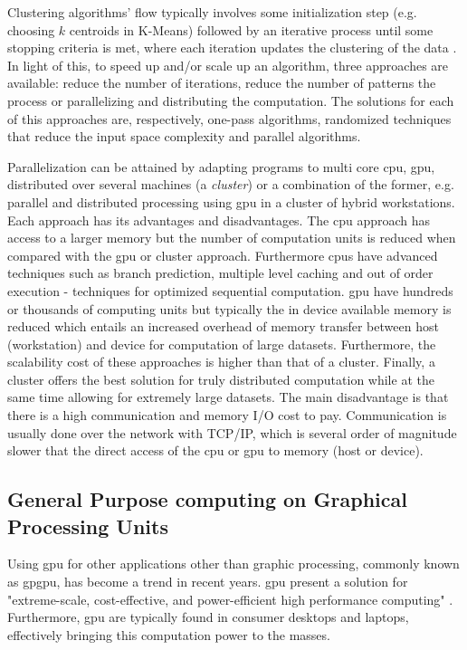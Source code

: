 Clustering algorithms' flow typically involves some initialization step (e.g. choosing $k$ centroids in K-Means) followed by an iterative process until some stopping criteria is met, where each iteration updates the clustering of the data \cite{Aggarwal2014}. In light of this, to speed up and/or scale up an algorithm, three approaches are available: reduce the number of iterations, reduce the number of patterns the process or parallelizing and distributing the computation. The solutions for each of this approaches are, respectively, one-pass algorithms, randomized techniques that reduce the input space complexity and parallel algorithms.

Parallelization can be attained by adapting programs to multi core \gls{cpu}, \gls{gpu}, distributed over several machines (a \emph{cluster}) or a combination of the former, e.g. parallel and distributed processing using \gls{gpu} in a cluster of hybrid workstations.
Each approach has its advantages and disadvantages.
The \gls{cpu} approach has access to a larger memory but the number of computation units is reduced when compared with the \gls{gpu} or cluster approach. Furthermore \gls{cpu}s have advanced techniques such as branch prediction, multiple level caching and out of order execution - techniques for optimized sequential computation.
\gls{gpu} have hundreds or thousands of computing units but typically the in device available memory is reduced which entails an increased overhead of memory transfer between host (workstation) and device for computation of large datasets.
Furthermore, the scalability cost of these approaches is higher than that of a cluster.
Finally, a cluster offers the best solution for truly distributed computation while at the same time allowing for extremely large datasets. The main disadvantage is that there is a high communication and memory I/O cost to pay. Communication is usually done over the network with TCP/IP, which is several order of magnitude slower that the direct access of the \gls{cpu} or \gls{gpu} to memory (host or device).



\subsection{General Purpose computing on Graphical Processing Units}
Using \gls{gpu} for other applications other than graphic processing, commonly known as \gls{gpgpu}, has become a trend in recent years. \gls{gpu} present a solution for "extreme-scale, cost-effective, and power-efficient high performance computing" \cite{Chen2012}. Furthermore, \gls{gpu} are typically found in consumer desktops and laptops, effectively bringing this computation power to the masses.

